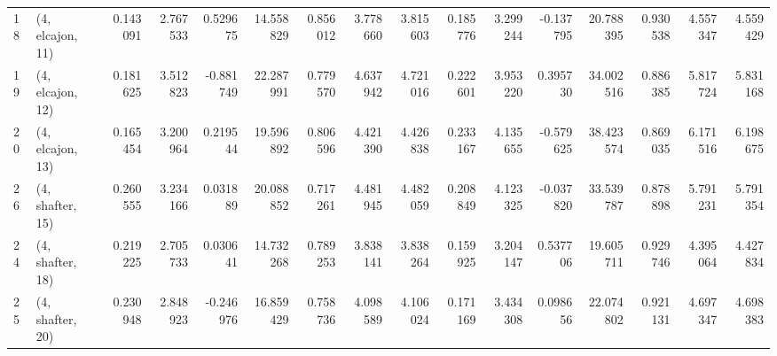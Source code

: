 \begin{tabular}{llrrrrrrrrrrrrrr}
18 &  (4, elcajon, 11) &   0.143091 &  2.767533 &  0.529675 &  14.558829 &  0.856012 &   3.778660 &  3.815603 &  0.185776 &   3.299244 & -0.137795 &   20.788395 &  0.930538 &   4.557347 &   4.559429 \\
19 &  (4, elcajon, 12) &   0.181625 &  3.512823 & -0.881749 &  22.287991 &  0.779570 &   4.637942 &  4.721016 &  0.222601 &   3.953220 &  0.395730 &   34.002516 &  0.886385 &   5.817724 &   5.831168 \\
20 &  (4, elcajon, 13) &   0.165454 &  3.200964 &  0.219544 &  19.596892 &  0.806596 &   4.421390 &  4.426838 &  0.233167 &   4.135655 & -0.579625 &   38.423574 &  0.869035 &   6.171516 &   6.198675 \\
26 &  (4, shafter, 15) &   0.260555 &  3.234166 &  0.031889 &  20.088852 &  0.717261 &   4.481945 &  4.482059 &  0.208849 &   4.123325 & -0.037820 &   33.539787 &  0.878898 &   5.791231 &   5.791354 \\
24 &  (4, shafter, 18) &   0.219225 &  2.705733 &  0.030641 &  14.732268 &  0.789253 &   3.838141 &  3.838264 &  0.159925 &   3.204147 &  0.537706 &   19.605711 &  0.929746 &   4.395064 &   4.427834 \\
25 &  (4, shafter, 20) &   0.230948 &  2.848923 & -0.246976 &  16.859429 &  0.758736 &   4.098589 &  4.106024 &  0.171169 &   3.434308 &  0.098656 &   22.074802 &  0.921131 &   4.697347 &   4.698383 \\
\bottomrule
\end{tabular}
